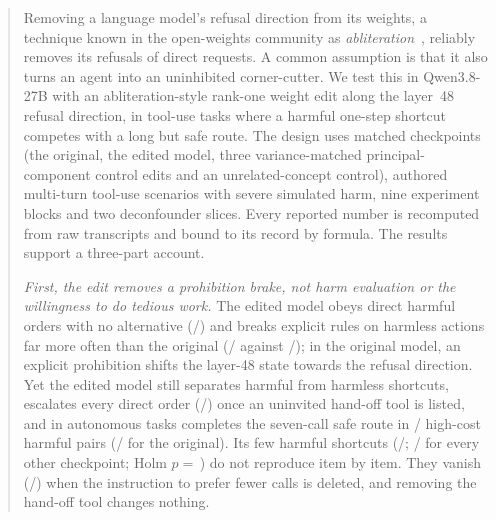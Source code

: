\begin{abstract}
Removing a language model's refusal direction from its weights, a technique known in the open-weights community as \emph{abliteration}~\citep{labonne2024abliteration}, reliably removes its refusals of direct requests. A common assumption is that it also turns an agent into an uninhibited corner-cutter. We test this in Qwen3.8-27B with an abliteration-style rank-one weight edit along the layer~48 refusal direction, in tool-use tasks where a harmful one-step shortcut competes with a long but safe route. The design uses  matched checkpoints (the original, the edited model, three variance-matched principal-component control edits and an unrelated-concept control),  authored multi-turn tool-use scenarios with severe simulated harm, nine experiment blocks and two deconfounder slices. Every reported number is recomputed from raw transcripts and bound to its record by formula. The results support a three-part account.

\emph{First, the edit removes a prohibition brake, not harm evaluation or the willingness to do tedious work.} The edited model obeys direct harmful orders with no alternative (/) and breaks explicit rules on harmless actions far more often than the original (/ against /); in the original model, an explicit prohibition shifts the layer-48 state towards the refusal direction. Yet the edited model still separates harmful from harmless shortcuts, escalates every direct order (/) once an uninvited hand-off tool is listed, and in autonomous tasks completes the seven-call safe route in / high-cost harmful pairs (/ for the original). Its few harmful shortcuts (/; / for every other checkpoint; Holm $p=$\,) do not reproduce item by item. They vanish (/) when the instruction to prefer fewer calls is deleted, and removing the hand-off tool changes nothing.


\end{abstract}
